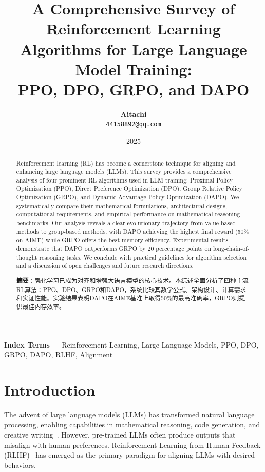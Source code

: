 \documentclass[10pt,twocolumn]{article}
\title{\LARGE\bfseries A Comprehensive Survey of Reinforcement Learning\\Algorithms for Large Language Model Training:\\[4pt]PPO, DPO, GRPO, and DAPO}
\author{
\textbf{Aitachi}\\
\texttt{44158892@qq.com}
}
\date{2025}
\begin{document}
\maketitle

\begin{abstract}
Reinforcement learning (RL) has become a cornerstone technique for aligning and enhancing large language models (LLMs). This survey provides a comprehensive analysis of four prominent RL algorithms used in LLM training: Proximal Policy Optimization (PPO), Direct Preference Optimization (DPO), Group Relative Policy Optimization (GRPO), and Dynamic Advantage Policy Optimization (DAPO). We systematically compare their mathematical formulations, architectural designs, computational requirements, and empirical performance on mathematical reasoning benchmarks. Our analysis reveals a clear evolutionary trajectory from value-based methods to group-based methods, with DAPO achieving the highest final reward (50\% on AIME) while GRPO offers the best memory efficiency. Experimental results demonstrate that DAPO outperforms GRPO by 20 percentage points on long-chain-of-thought reasoning tasks. We conclude with practical guidelines for algorithm selection and a discussion of open challenges and future research directions.

\medskip\noindent\textbf{摘要}：强化学习已成为对齐和增强大语言模型的核心技术。本综述全面分析了四种主流RL算法：PPO、DPO、GRPO和DAPO，系统比较其数学公式、架构设计、计算需求和实证性能。实验结果表明DAPO在AIME基准上取得50\%的最高准确率，GRPO则提供最佳内存效率。
\end{abstract}

\medskip\noindent\textbf{Index Terms} --- Reinforcement Learning, Large Language Models, PPO, DPO, GRPO, DAPO, RLHF, Alignment

\section{Introduction}
\label{sec:intro}

The advent of large language models (LLMs) has transformed natural language processing, enabling capabilities in mathematical reasoning, code generation, and creative writing~\cite{touvron2023llama, achiam2023gpt4}. However, pre-trained LLMs often produce outputs that misalign with human preferences. Reinforcement Learning from Human Feedback (RLHF)~\cite{ouyang2022instructgpt, christo2017deep} has emerged as the primary paradigm for aligning LLMs with desired behaviors.
\end{document}
